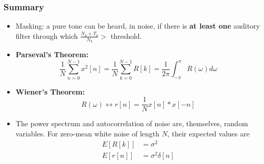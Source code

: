 \documentclass{beamer}
\begin{document}
\begin{frame}
  \frametitle{Summary}
  \begin{itemize}
  \item Masking: a pure tone can be heard, in noise, if there is {\bf at least one}
    auditory filter through which $\frac{N_k+T_k}{N_k}>$ threshold.
  \item {\bf Parseval's Theorem:}
    \[
    \frac{1}{N}\sum_{n=0}^{N-1}x^2[n] = \frac{1}{N}\sum_{k=0}^{N-1}R[k]=
    \frac{1}{2\pi}\int_{-\pi}^{\pi}R(\omega)d\omega
    \]
  \item {\bf Wiener's Theorem:}
    \[
    R(\omega) \leftrightarrow r[n] = \frac{1}{N} x[n]\ast x[-n]
    \]
  \item The power spectrum and autocorrelation of noise are, themselves, random variables.
    For zero-mean white noise of length $N$, their expected values are
    \begin{align*}
      E\left[R[k]\right] &= \sigma^2\\
      E\left[r[n]\right] &= \sigma^2\delta[n]
    \end{align*}
  \end{itemize}
\end{frame}
\end{document}
